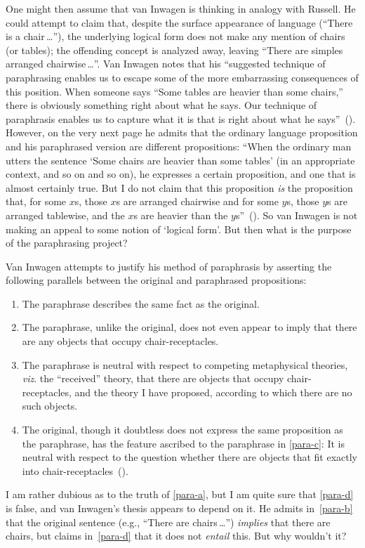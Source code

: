 \documentclass[11pt]{article}
\begin{document}
\begin{spacing}{1.5}
One might then assume that van Inwagen is thinking in analogy with Russell. He could attempt to claim that, despite the surface appearance of language (``There is a chair\,\ldots ''), the underlying logical form does not make any mention of chairs (or tables); the offending concept is analyzed away, leaving ``There are simples arranged chairwise\,\ldots ''. Van Inwagen notes that his ``suggested technique of paraphrasing enables us to escape some of the more embarrassing consequences of this position. When someone says ``Some tables are heavier than some chairs,'' there is obviously something right about what he says. Our technique of paraphrasis enables us to capture what it is that is right about what he says''~(\citeyear[111]{inwagen1995}). However, on the very next page he admits that the ordinary language proposition and his paraphrased version are different propositions: ``When the ordinary man utters the sentence `Some chairs are heavier than some tables' (in an appropriate context, and so on and so on), he expresses a certain proposition, and one that is almost certainly true. But I do not claim that this proposition {\em is} the proposition that, for some $x$s, those $x$s are arranged chairwise and for some $y$s, those $y$s are arranged tablewise, and the $x$s are heavier than the $y$s''~(\citeyear[112]{inwagen1995}). So van Inwagen is not making an appeal to some notion of `logical form'. But then what is the purpose of the paraphrasing project?

Van Inwagen attempts to justify his method of paraphrasis by asserting the following parallels between the original and paraphrased propositions:
\begin{enumerate}[label=(\Alph*)]
	\item The paraphrase describes the same fact as the original. \label{para-a}
	\item The paraphrase, unlike the original, does not even appear to imply that there are any objects that occupy chair-receptacles. \label{para-b}
	\item The paraphrase is neutral with respect to competing metaphysical theories, {\em viz}. the ``received'' theory, that there are objects that occupy chair-receptacles, and the theory I have proposed, according to which there are no such objects. \label{para-c}
	\item The original, though it doubtless does not express the same proposition as the paraphrase, has the feature ascribed to the paraphrase in \ref{para-c}: It is neutral with respect to the question whether there are objects that fit exactly into chair-receptacles~(\citeyear[113]{inwagen1995}). \label{para-d}
\end{enumerate}
I am rather dubious as to the truth of \ref{para-a}, but I am quite sure that \ref{para-d} is false, and van Inwagen's thesis appears to depend on it. He admits in~\ref{para-b} that the original sentence (e.g., ``There are chairs\,\ldots '') {\em implies} that there are chairs, but claims in~\ref{para-d} that it does not {\em entail} this. But why wouldn't it?


\end{spacing}
\end{document}
